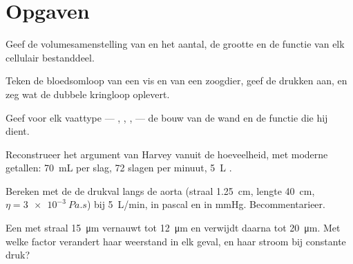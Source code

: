 \section{Opgaven}

\begin{exercise}[$\star$]\label{exo:b2:blood-circulation:1}
Geef de volumesamenstelling van  en het aantal, de grootte en de
functie van elk cellulair bestanddeel.
\end{exercise}

\begin{exercise}[$\star$]\label{exo:b2:blood-circulation:2}
Teken de bloedsomloop van een vis en van een zoogdier, geef de drukken aan,
en zeg wat de dubbele kringloop oplevert.
\end{exercise}

\begin{exercise}[$\star$]\label{exo:b2:blood-circulation:3}
Geef voor elk vaattype --- , , ,  --- de bouw van
de wand en de functie die hij dient.
\end{exercise}

\begin{exercise}[$\star$]\label{exo:b2:blood-circulation:4}
Reconstrueer het argument van Harvey vanuit de hoeveelheid, met moderne
getallen: \qty{70}{mL} per slag, \num{72} slagen per minuut, \qty{5}{L} .
\end{exercise}

\begin{exercise}[$\star\star$]\label{exo:b2:blood-circulation:5}
Bereken met de  de drukval langs de aorta (straal
\qty{1.25}{cm}, lengte \qty{40}{cm}, $\eta = \qty{3e-3}{Pa.s}$) bij
\qty{5}{L/min}, in pascal en in mmHg. Becommentarieer.
\end{exercise}

\begin{exercise}[$\star\star$]\label{exo:b2:blood-circulation:6}
Een  met straal \qty{15}{\micro m} vernauwt tot
\qty{12}{\micro m} en verwijdt daarna tot \qty{20}{\micro m}. Met welke
factor verandert haar weerstand in elk geval, en haar stroom bij constante
druk?
\end{exercise}

